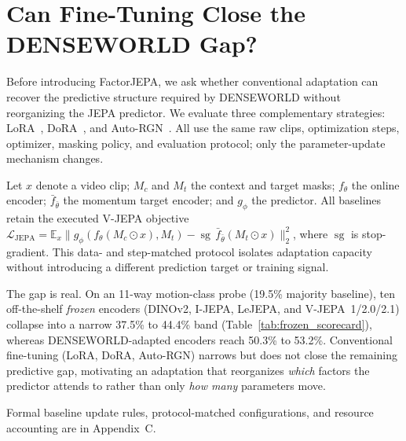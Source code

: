 





\section{Can Fine-Tuning Close the DENSEWORLD Gap?}
\label{sec:vjepa_adaptation_baselines}

Before introducing FactorJEPA, we ask whether conventional adaptation can recover the predictive structure required by DENSEWORLD without reorganizing the JEPA predictor. We evaluate three complementary strategies: LoRA~\cite{hu2022lora}, DoRA~\cite{liu2024dora}, and Auto-RGN~\cite{lee2023surgical}. All use the same raw clips, optimization steps, optimizer, masking policy, and evaluation protocol; only the parameter-update mechanism changes.

Let $x$ denote a video clip; $M_c$ and $M_t$ the context and target masks; $f_\theta$ the online encoder; $\bar f_{\bar\theta}$ the momentum target encoder; and $g_\phi$ the predictor. All baselines retain the executed V-JEPA objective~\cite{bardes2024vjepa} $\mathcal{L}_{\mathrm{JEPA}}=\mathbb{E}_{x}\big\|g_\phi(f_\theta(M_c\odot x),M_t)-\operatorname{sg}\,\bar f_{\bar\theta}(M_t\odot x)\big\|_2^2$, where $\operatorname{sg}$ is stop-gradient. This data- and step-matched protocol isolates adaptation capacity without introducing a different prediction target or training signal.

The gap is real. On an 11-way motion-class probe (19.5\% majority baseline), ten off-the-shelf \emph{frozen} encoders (DINOv2, I-JEPA, LeJEPA, and V-JEPA~1/2.0/2.1) collapse into a narrow 37.5\% to 44.4\% band (Table~\ref{tab:frozen_scorecard}), whereas DENSEWORLD-adapted encoders reach 50.3\% to 53.2\%. Conventional fine-tuning (LoRA, DoRA, Auto-RGN) narrows but does not close the remaining predictive gap, motivating an adaptation that reorganizes \emph{which} factors the predictor attends to rather than only \emph{how many} parameters move.



Formal baseline update rules, protocol-matched configurations, and resource accounting are in Appendix~C.

